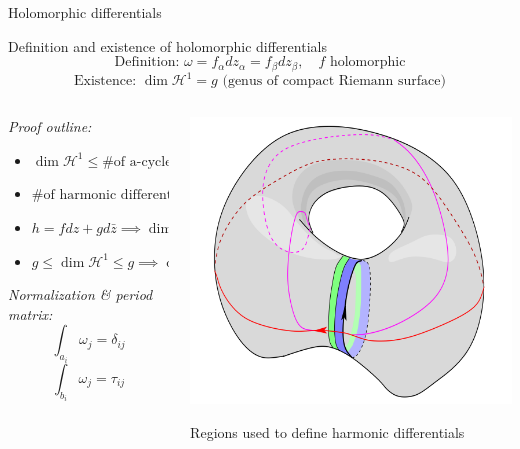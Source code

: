 \documentclass[11pt,aspectratio=169]{beamer}
\begin{document}
\begin{frame}{Holomorphic differentials}
    \begin{block}{Definition and existence of holomorphic differentials}
        \vspace{-1em}
        \[\text{Definition: } \omega = f_\alpha dz_\alpha = f_\beta dz_\beta , \quad f \text{ holomorphic}\]
        \[\text{Existence: } \dim \mathcal H^1 = g \text{ (genus of compact Riemann surface)}\]
    \end{block}


    \begin{columns}[onlytextwidth]
        \begin{column}{0.55\textwidth}
            \emph{Proof outline:}
            \begin{itemize}
                \item $\dim \mathcal H^1 \leq \text{\# of a-cycles} = g$
                \item $\text{\# of harmonic differentials} = \dim H \geq 2g$
                \item $h = f dz + g d \bar z \implies \dim H = 2 \dim \mathcal H^1$
                \item $g \leq \dim \mathcal H^1 \leq g \implies \dim \mathcal H^1 = g$
            \end{itemize}

            \emph{Normalization \& period matrix:}
            \[ \int_{a_i} \omega_j = \delta_{ij} \]
            \[ \int_{b_i} \omega_j = \tau_{ij} \]
        \end{column}
        \begin{column}{0.45\textwidth}
            \center{}
            \includegraphics[width=0.8\columnwidth]{assets/HarmonicDifferential.png}
            
            \tiny Regions used to define harmonic differentials

            \cite{Ber06}
        \end{column}
    \end{columns}
\end{frame}
\end{document}
